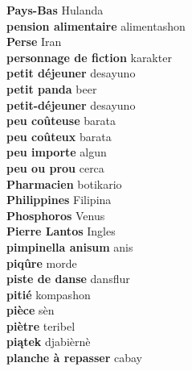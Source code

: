 \textbf{ Pays-Bas  } Hulanda \\
\textbf{ pension alimentaire  } alimentashon \\
\textbf{ Perse  } Iran \\
\textbf{ personnage de fiction  } karakter \\
\textbf{ petit déjeuner  } desayuno \\
\textbf{ petit panda  } beer \\
\textbf{ petit-déjeuner  } desayuno \\
\textbf{ peu coûteuse  } barata \\
\textbf{ peu coûteux  } barata \\
\textbf{ peu importe  } algun \\
\textbf{ peu ou prou  } cerca \\
\textbf{ Pharmacien  } botikario \\
\textbf{ Philippines  } Filipina \\
\textbf{ Phosphoros  } Venus \\
\textbf{ Pierre Lantos  } Ingles \\
\textbf{ pimpinella anisum  } anis \\
\textbf{ piqûre  } morde \\
\textbf{ piste de danse  } dansflur \\
\textbf{ pitié  } kompashon \\
\textbf{ pièce  } sèn \\
\textbf{ piètre  } teribel \\
\textbf{ piątek  } djabièrnè \\
\textbf{ planche à repasser  } cabay \\
